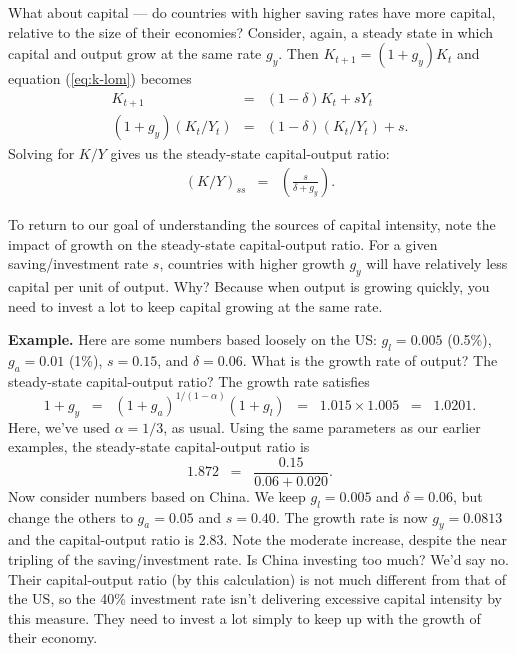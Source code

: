 What about capital --- do countries with higher saving rates have more
capital, relative to the size of their economies?
Consider, again, a steady state in which capital and output grow
at the same rate $g_y$.
Then $K_{t+1} = (1+g_y) K_t$ and equation (\ref{eq:k-lom}) becomes
\begin{eqnarray*}
    K_{t+1}  &=& (1-\delta) K_t + s Y_t  \\
    (1+g_y) (K_{t}/Y_{t}) &=& (1-\delta) (K_t/Y_t) + s .
\end{eqnarray*}
Solving for $K/Y$ gives us the steady-state capital-output ratio:
\begin{eqnarray*}
    (K/Y)_{ss} &=& \left( \frac{s}{\delta+g_y} \right) .
\end{eqnarray*}

To return to our goal of understanding the sources of capital intensity,
note the impact of growth on the steady-state capital-output ratio.
For a given saving/investment rate $s$, countries with higher growth $g_y$
will have relatively less capital per unit of output.
Why?  Because when output is growing quickly,
you need to invest a lot to keep capital growing at the same rate.


\textbf{Example.}
Here are some numbers based loosely on the US:
$ g_l = 0.005 $ (0.5\%), $ g_a = 0.01 $ (1\%), $s=0.15$,
and $\delta = 0.06$.
What is the growth rate of output?
The steady-state capital-output ratio?
The growth rate satisfies
\[
    1+g_y \;\;=\;\; (1+g_a)^{1/(1-\alpha)} (1+g_l) \;\;=\;\; 1.015 \times 1.005
        \;\;=\;\; 1.0201.
\]
Here, we've used $\alpha = 1/3$, as usual.
Using the same parameters as our earlier examples, the steady-state
capital-output ratio is
\[
    1.872 \;\;=\;\; \frac{0.15}{0.06 + 0.020} .
\]
Now consider numbers based on China.
We keep $ g_l = 0.005 $ and $\delta = 0.06$,
but change the others to $ g_a = 0.05 $ and $s = 0.40 $.
The growth rate is now $g_y = 0.0813$ and the capital-output ratio
is 2.83. Note the moderate increase, despite the near tripling of the
saving/investment rate. Is China investing too much?
We'd say no. Their capital-output ratio (by this calculation)
is not much different from that of the US, so the 40\% investment
rate isn't delivering excessive capital intensity by this measure.
They need to invest a lot simply to keep up with the growth
of their economy.


